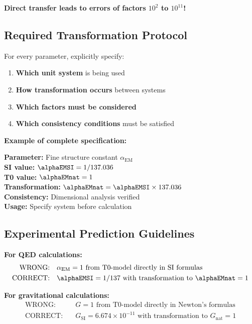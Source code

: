 	\textbf{Direct transfer leads to errors of factors $10^2$ to $10^{11}$!}
	
	\subsection{Required Transformation Protocol}
	\label{subsec:transformation_protocol}
	
	For every parameter, explicitly specify:
	
	\begin{enumerate}
		\item \textbf{Which unit system} is being used
		\item \textbf{How transformation occurs} between systems
		\item \textbf{Which factors must be considered}
		\item \textbf{Which consistency conditions} must be satisfied
	\end{enumerate}
	
	\textbf{Example of complete specification:}
	\begin{tcolorbox}[colback=red!5!white,colframe=red!75!black,title=Parameter Specification Template]
		\textbf{Parameter:} Fine structure constant $\alpha_{\text{EM}}$ \\
		\textbf{SI value:} $\alphaEMSI = 1/137.036$ \\
		\textbf{T0 value:} $\alphaEMnat = 1$ \\
		\textbf{Transformation:} $\alphaEMnat = \alphaEMSI \times 137.036$ \\
		\textbf{Consistency:} Dimensional analysis verified \\
		\textbf{Usage:} Specify system before calculation
	\end{tcolorbox}
	
	\subsection{Experimental Prediction Guidelines}
	\label{subsec:experimental_guidelines}
	
	\textbf{For QED calculations:}
	\begin{align}
		\text{WRONG:} \quad &\alpha_{\text{EM}} = 1 \text{ from T0-model directly in SI formulas} \\
		\text{CORRECT:} \quad &\alphaEMSI = 1/137 \text{ with transformation to } \alphaEMnat = 1
	\end{align}
	
	\textbf{For gravitational calculations:}
	\begin{align}
		\text{WRONG:} \quad &G = 1 \text{ from T0-model directly in Newton's formulas} \\
		\text{CORRECT:} \quad &G_{\text{SI}} = 6.674 \times 10^{-11} \text{ with transformation to } G_{\text{nat}} = 1
	\end{align}
	

